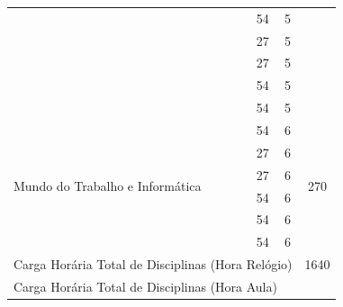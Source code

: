 \documentclass[11pt,fleqn]{book} %
\begin{document}
\begin{table}[H]
{\begin{tabular}{|l|l|c|c|c|}
			& \nameref{5_metodologia}                         & 54                         &  5                &                      \\ \cline{2-4}
			& \nameref{5_libras}                              & 27                         &  5                &                      \\ \cline{2-4}
			& \nameref{5_etica}                               & 27                         &  5                &                      \\ \cline{2-4}
			& \nameref{5_sd}                                  & 54                         &  5                &                      \\ \cline{2-4}
			& \nameref{5_lab}                                 & 54                         &  5                &                      \\ \hline
			\multirow{6}{*}{Mundo do Trabalho e Informática}                           
			& \nameref{6_ia}                                  & 54                         &  6                & \multirow{6}{*}{270} \\ \cline{2-4}
			& \nameref{6_seginfo}                             & 27                         &  6                &                      \\ \cline{2-4}
			& \nameref{6_empdig}                              & 27                         &  6                &                      \\ \cline{2-4}
			& \nameref{6_datascience}                         & 54                         &  6                &                      \\ \cline{2-4}
			& \nameref{6_visstory}                            & 54                         &  6                &                      \\ \cline{2-4}
			& \nameref{6_opt}                                 & 54                         &  6                &                      \\ \hline
			\multicolumn{4}{|l|}{Carga Horária Total de Disciplinas (Hora Relógio)}                                                                                                                                                                                     
			& 1640                 \\ \hline
			\multicolumn{4}{|l|}{Carga Horária Total de Disciplinas (Hora Aula)}                                                                                                                                                                                        

\end{tabular}}
\end{table}
\end{document}
